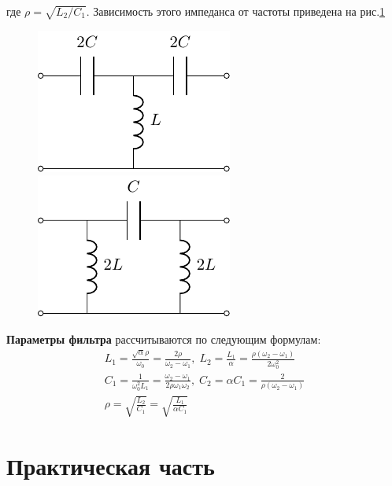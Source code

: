 где $\rho=\sqrt{L_2/C_1}$. Зависимость этого импеданса от частоты приведена на рис.\ref{fig:7.4}
\begin{figure}
\begin{minipage}{0.49\linewidth}
	\centering
	\includegraphics[]{chem/FHF/FHFT.pdf}
\end{minipage}
\begin{minipage}{0.49\linewidth}
	\centering
	\includegraphics[]{chem/FHF/FHFP.pdf}
\end{minipage}
\caption{}
\label{fig:7.4}
\end{figure}

\textbf{Параметры фильтра} рассчитываются по следующим формулам:
\begin{equation}
\label{eq:7.8}
\begin{gathered}
L_1=\frac{\sqrt{\alpha}\rho}{\omega_0}=\frac{2\rho}{\omega_2-\omega_1},\;
L_2=\frac{L_1}{\alpha}=\frac{\rho(\omega_2-\omega_1)}{2\omega^2_0}\\
C_1=\frac{1}{\omega^2_0L_1}=\frac{\omega_2-\omega_1}{2\rho\omega_1\omega_2},\;
C_2=\alpha C_1=\frac{2}{\rho(\omega_2-\omega_1)}\\
\rho=\sqrt{\frac{L_2}{C_1}}=\sqrt{\frac{L_1}{\alpha C_1}}
\end{gathered}
\end{equation}

\section{Практическая часть}
